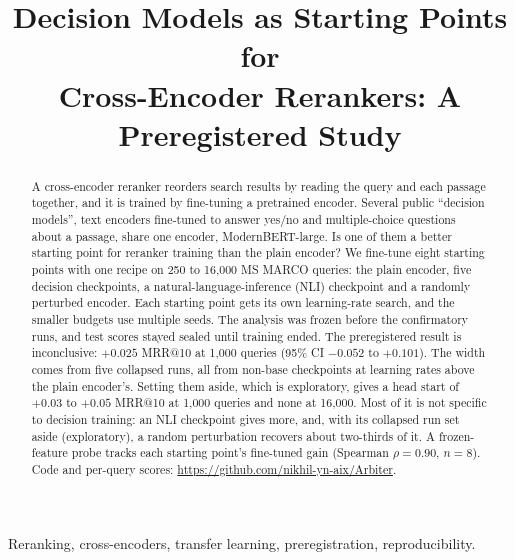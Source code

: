 \documentclass[conference]{IEEEtran}
\makeatletter
\newcommand{\ms}{MRR@10}
\makeatother
\begin{document}
\title{Decision Models as Starting Points for\\Cross-Encoder Rerankers: A Preregistered Study}

\author{
}

\maketitle

\begin{abstract}
A cross-encoder reranker reorders search results by reading the query and each passage together, and it is trained by fine-tuning a pretrained encoder. Several public ``decision models'', text encoders fine-tuned to answer yes/no and multiple-choice questions about a passage, share one encoder, ModernBERT-large. Is one of them a better starting point for reranker training than the plain encoder? We fine-tune eight starting points with one recipe on 250 to 16{,}000 MS MARCO queries: the plain encoder, five decision checkpoints, a natural-language-inference (NLI) checkpoint and a randomly perturbed encoder. Each starting point gets its own learning-rate search, and the smaller budgets use multiple seeds. The analysis was frozen before the confirmatory runs, and test scores stayed sealed until training ended. The preregistered result is inconclusive: $+0.025$ \ms{} at 1{,}000 queries (95\% CI $-0.052$ to $+0.101$). The width comes from five collapsed runs, all from non-base checkpoints at learning rates above the plain encoder's. Setting them aside, which is exploratory, gives a head start of $+0.03$ to $+0.05$ \ms{} at 1{,}000 queries and none at 16{,}000. Most of it is not specific to decision training: an NLI checkpoint gives more, and, with its collapsed run set aside (exploratory), a random perturbation recovers about two-thirds of it. A frozen-feature probe tracks each starting point's fine-tuned gain (Spearman $\rho=0.90$, $n=8$). Code and per-query scores: \url{https://github.com/nikhil-yn-aix/Arbiter}.
\end{abstract}

\begin{IEEEkeywords}
Reranking, cross-encoders, transfer learning, preregistration, reproducibility.
\end{IEEEkeywords}
\end{document}
